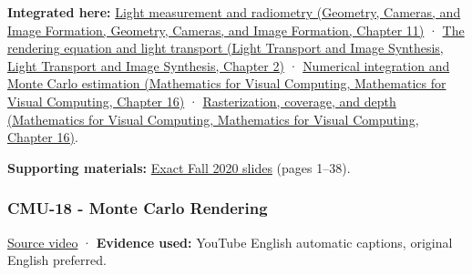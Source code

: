 \textbf{Integrated here:} \href{../03-Geometry-Cameras-and-Image-Formation/main.pdf\#nameddest=03-visual-computing-i-ch004-light-measurement-and-radiometry}{Light measurement and radiometry (Geometry, Cameras, and Image Formation, Geometry, Cameras, and Image Formation, Chapter 11)} · \href{../04-Light-Transport-and-Image-Synthesis/main.pdf\#nameddest=03-visual-computing-i-ch007-the-rendering-equation-and-light-transport}{The rendering equation and light transport (Light Transport and Image Synthesis, Light Transport and Image Synthesis, Chapter 2)} · \href{../02-Mathematics-for-Visual-Computing/main.pdf\#nameddest=03-visual-computing-i-ch012-numerical-integration-and-monte-carlo-estimation}{Numerical integration and Monte Carlo estimation (Mathematics for Visual Computing, Mathematics for Visual Computing, Chapter 16)} · \href{../02-Mathematics-for-Visual-Computing/main.pdf\#nameddest=03-visual-computing-i-ch012-rasterization-coverage-and-depth}{Rasterization, coverage, and depth (Mathematics for Visual Computing, Mathematics for Visual Computing, Chapter 16)}.

\textbf{Supporting materials:} \href{https://15462.courses.cs.cmu.edu/fall2020content/lectures/17_numericalintegration/17_numericalintegration_slides.pdf}{Exact Fall 2020 slides} (pages 1--38).

\subsubsection{CMU-18 - Monte Carlo Rendering}\label{04-visual-computing-ii-ch036-cmu-18---monte-carlo-rendering}

\href{https://www.youtube.com/watch?v=FUZJNlRqrAc}{Source video} · \textbf{Evidence used:} YouTube English automatic captions, original English preferred.

